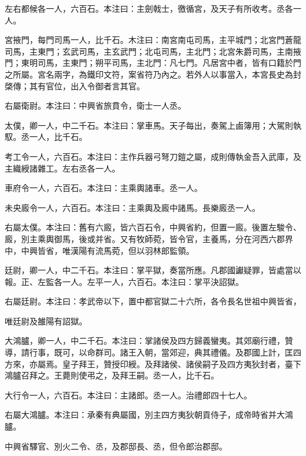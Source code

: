 \begin{pinyinscope}
左右都候各一人，六百石。本注曰：主劍戟士，徼循宮，及天子有所收考。丞各一人。

宮掖門，每門司馬一人，比千石。木注曰：南宮南屯司馬，主平城門；北宮門蒼龍司馬，主東門；玄武司馬，主玄武門；北屯司馬，主北門；北宮朱爵司馬，主南掖門；東明司馬，主東門；朔平司馬，主北門：凡七門。凡居宮中者，皆有口籍於門之所屬。宮名兩字，為鐵印文符，案省符乃內之。若外人以事當入，本宮長史為封棨傳；其有官位，出入令御者言其官。

右屬衛尉。本注曰：中興省旅賁令，衛士一人丞。

太僕，卿一人，中二千石。本注曰：掌車馬。天子每出，奏駕上鹵簿用；大駕則執馭。丞一人，比千石。

考工令一人，六百石。本注曰：主作兵器弓弩刀鎧之屬，成則傳執金吾入武庫，及主織綬諸雜工。左右丞各一人。

車府令一人，六百石。本注曰：主乘輿諸車。丞一人。

未央廄令一人，六百石。本注曰：主乘輿及廄中諸馬。長樂廄丞一人。

右屬太僕。本注曰：舊有六廄，皆六百石令，中興省約，但置一廄。後置左駿令、廄，別主乘輿御馬，後或并省。又有牧師菀，皆令官，主養馬，分在河西六郡界中，中興皆省，唯漢陽有流馬菀，但以羽林郎監領。

廷尉，卿一人，中二千石。本注曰：掌平獄，奏當所應。凡郡國讞疑罪，皆處當以報。正、左監各一人。左平一人，六百石。本注曰：掌平決詔獄。

右屬廷尉。本注曰：孝武帝以下，置中都官獄二十六所，各令長名世祖中興皆省，

唯廷尉及雒陽有詔獄。

大鴻臚，卿一人，中二千石。本注曰：掌諸侯及四方歸義蠻夷。其郊廟行禮，贊導，請行事，既可，以命群司。諸王入朝，當郊迎，典其禮儀。及郡國上計，匡四方來，亦屬焉。皇子拜王，贊授印綬。及拜諸侯、諸侯嗣子及四方夷狄封者，臺下鴻臚召拜之。王薨則使弔之，及拜王嗣。丞一人，比千石。

大行令一人，六百石。本注曰：主諸郎。丞一人。治禮郎四十七人。

右屬大鴻臚。本注曰：承秦有典屬國，別主四方夷狄朝貢侍子，成帝時省并大鴻臚。

中興省驛官、別火二令、丞，及郡邸長、丞，但令郎治郡邸。


\end{pinyinscope}
